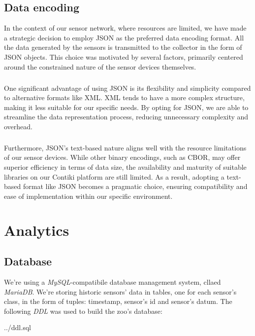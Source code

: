 \documentclass[parskip=full]{report}
\begin{document}
\section{Data encoding}

In the context of our sensor network, where resources are limited, we have made a strategic decision to employ JSON as the preferred data encoding format. All the data generated by the sensors is transmitted to the collector in the form of JSON objects. This choice was motivated by several factors, primarily centered around the constrained nature of the sensor devices themselves.
\paragraph{}
One significant advantage of using JSON is its flexibility and simplicity compared to alternative formats like XML. XML tends to have a more complex structure, making it less suitable for our specific needs. By opting for JSON, we are able to streamline the data representation process, reducing unnecessary complexity and overhead.

\paragraph{}
Furthermore, JSON's text-based nature aligns well with the resource limitations of our sensor devices. While other binary encodings, such as CBOR, may offer superior efficiency in terms of data size, the availability and maturity of suitable libraries on our Contiki platform are still limited. As a result, adopting a text-based format like JSON becomes a pragmatic choice, ensuring compatibility and ease of implementation within our specific environment.
\chapter{Analytics}

\section{Database}

We're using a \textit{MySQL}-compatibile database management system, cllaed \textit{MariaDB}. We're storing historic sensors' data in tables, one for each sensor's class, in the form of tuples: timestamp, sensor's id and sensor's datum. The following \textit{DDL} was used to build the zoo's database:


{../ddl.sql}
\end{document}

